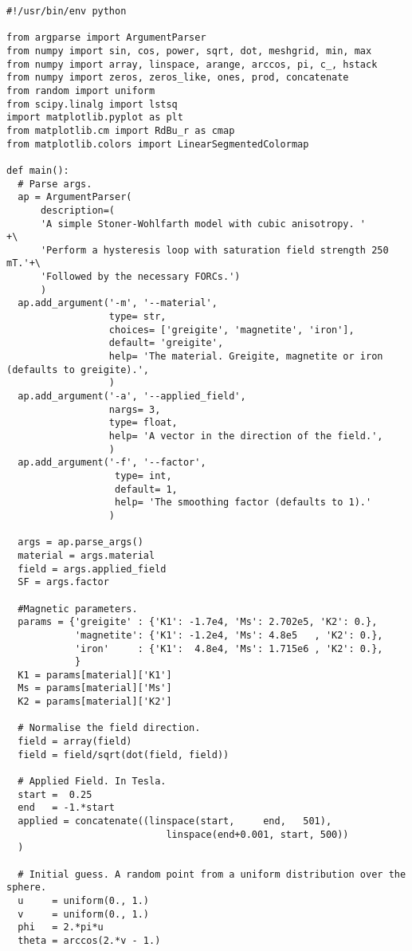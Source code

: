 \begin{lstlisting}
#!/usr/bin/env python

from argparse import ArgumentParser
from numpy import sin, cos, power, sqrt, dot, meshgrid, min, max
from numpy import array, linspace, arange, arccos, pi, c_, hstack
from numpy import zeros, zeros_like, ones, prod, concatenate
from random import uniform
from scipy.linalg import lstsq
import matplotlib.pyplot as plt
from matplotlib.cm import RdBu_r as cmap
from matplotlib.colors import LinearSegmentedColormap

def main():
  # Parse args.
  ap = ArgumentParser(
      description=(
      'A simple Stoner-Wohlfarth model with cubic anisotropy. '         +\
      'Perform a hysteresis loop with saturation field strength 250 mT.'+\
      'Followed by the necessary FORCs.')
      )
  ap.add_argument('-m', '--material',
                  type= str,
                  choices= ['greigite', 'magnetite', 'iron'],
                  default= 'greigite',
                  help= 'The material. Greigite, magnetite or iron (defaults to greigite).',
                  )
  ap.add_argument('-a', '--applied_field',
                  nargs= 3,
                  type= float,
                  help= 'A vector in the direction of the field.',
                  )
  ap.add_argument('-f', '--factor',
                   type= int,
                   default= 1,
                   help= 'The smoothing factor (defaults to 1).'
                  )

  args = ap.parse_args()
  material = args.material
  field = args.applied_field
  SF = args.factor

  #Magnetic parameters.
  params = {'greigite' : {'K1': -1.7e4, 'Ms': 2.702e5, 'K2': 0.},
            'magnetite': {'K1': -1.2e4, 'Ms': 4.8e5   , 'K2': 0.},
            'iron'     : {'K1':  4.8e4, 'Ms': 1.715e6 , 'K2': 0.},
            }
  K1 = params[material]['K1']
  Ms = params[material]['Ms']
  K2 = params[material]['K2']

  # Normalise the field direction.
  field = array(field)
  field = field/sqrt(dot(field, field))

  # Applied Field. In Tesla.
  start =  0.25
  end   = -1.*start
  applied = concatenate((linspace(start,     end,   501),
                            linspace(end+0.001, start, 500))
  )

  # Initial guess. A random point from a uniform distribution over the sphere.
  u     = uniform(0., 1.)
  v     = uniform(0., 1.)
  phi   = 2.*pi*u
  theta = arccos(2.*v - 1.)


\end{lstlisting}

